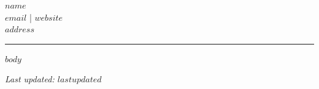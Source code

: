 \documentclass[11pt]{article}
\begin{document}
\begin{center}
  {\LARGE\bfseries $name$}\\[6pt]
  {\small $email$ \;|\; $website$}\\[2pt]
  {\small $address$}
\end{center}

\vspace{2pt}
\noindent\rule{\textwidth}{0.5pt}

$body$

\vfill
\begin{center}
  {\small \textit{Last updated: $lastupdated$}}
\end{center}
\end{document}
